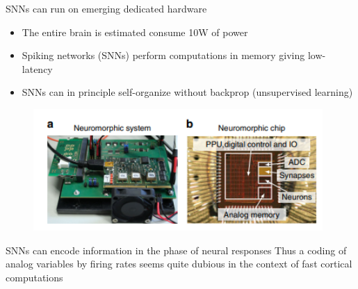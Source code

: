 \documentclass[aspectratio=169]{beamer}
\begin{document}
\begin{frame}{SNNs can run on emerging dedicated hardware}

\begin{itemize}
\item The entire brain is estimated consume 10W of power
\item Spiking networks (SNNs) perform computations in memory giving low-latency
\item SNNs can in principle self-organize without backprop (unsupervised learning)
\end{itemize}

\begin{figure}
\includegraphics[width=110mm]{hardware-figure}
\end{figure}

\end{frame}

\begin{frame}{SNNs can encode information in the phase of neural responses}
Thus a coding of analog variables by firing rates seems quite dubious in the context of fast cortical computations 

\end{frame}
\end{document}
